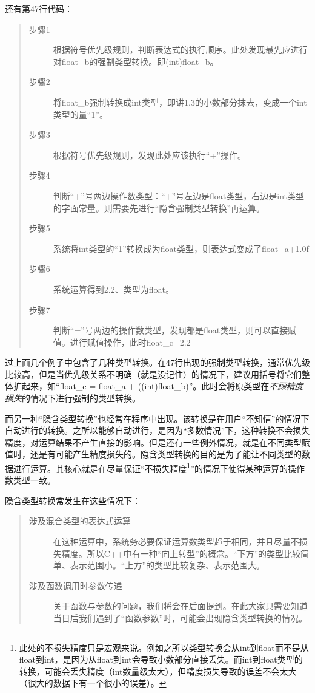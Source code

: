 还有第47行代码：
\begin{quote}
	\begin{description}
		\item[步骤1] 根据符号优先级规则，判断表达式的执行顺序。此处发现最先应进行对float\_b的强制类型转换。即(int)float\_b。
		\item[步骤2] 将float\_b强制转换成int类型，即讲1.3的小数部分抹去，变成一个int类型的量“1”。
		\item[步骤3] 根据符号优先级规则，发现此处应该执行“+”操作。
		\item[步骤4] 判断“+”号两边操作数类型：“+”号左边是float类型，右边是int类型的字面常量。则需要先进行“隐含强制类型转换”再运算。
		\item[步骤5] 系统将int类型的“1”转换成为float类型，则表达式变成了float\_a+1.0f
		\item[步骤6] 系统运算得到2.2、类型为float。
		\item[步骤7] 判断“=”号两边的操作数类型，发现都是float类型，则可以直接赋值。进行赋值操作，此时float\_c=2.2
	\end{description}
\end{quote}

过上面几个例子中包含了几种类型转换。在47行出现的强制类型转换，通常优先级比较高，但是当优先级关系不明确（就是没记住）的情况下，建议用括号将它们整体扩起来，如“float\_c = float\_a + ((int)float\_b)”。此时会将原类型在\emph{不顾精度损失}的情况下进行强制的类型转换。

而另一种“隐含类型转换”也经常在程序中出现。该转换是在用户“不知情”的情况下自动进行的转换。之所以能够自动进行，是因为“多数情况”下，这种转换不会损失精度，对运算结果不产生直接的影响。但是还有一些例外情况，就是在不同类型赋值时，还是有可能产生精度损失的。隐含类型转换的目的是为了能让不同类型的数据进行运算。其核心就是在尽量保证“不损失精度\footnote{此处的不损失精度只是宏观来说。例如之所以类型转换会从int到float而不是从float到int，是因为从float到int会导致小数部分直接丢失。而int到float类型的转换，可能会丢失精度（int数量级太大），但精度损失导致的误差不会太大（很大的数据下有一个很小的误差）。}”的情况下使得某种运算的操作数类型一致。

隐含类型转换常发生在这些情况下：
\begin{quote}
	\begin{description}
		\item[涉及混合类型的表达式运算] 在这种运算中，系统务必要保证运算数类型趋于相同，并且尽量不损失精度。所以C++中有一种“向上转型”的概念。“下方”的类型比较简单、表示范围小。“上方”的类型比较复杂、表示范围大。
		\item[涉及函数调用时参数传递] 关于函数与参数的问题，我们将会在后面提到。在此大家只需要知道当日后我们遇到了“函数参数”时，可能会出现隐含类型转换的情况。
	\end{description}
\end{quote}

